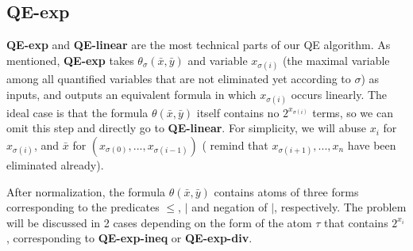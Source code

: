 \subsection{QE-exp}

\textbf{QE-exp} and \textbf{QE-linear} are the most technical parts of our QE algorithm.
As mentioned, 
\textbf{QE-exp} takes $\theta_{\sigma}(\bar{x},\bar{y})$ and  variable $x_{\sigma(i)}$ (the maximal variable among all quantified variables that are not eliminated yet according to $\sigma$) as 
inputs, and  outputs an equivalent formula in which $x_{\sigma(i)}$ occurs linearly.
The ideal case is that the formula $\theta(\bar{x},\bar{y})$ itself contains no $2^{x_{\sigma(i)}}$ terms, so we can omit this step and directly go to \textbf{QE-linear}.
For simplicity, we will abuse   $x_i$ for $x_{\sigma(i)}$, 
and  $\bar{x}$ for $(x_{\sigma(0)},...,x_{\sigma(i-1)})$ ( remind that $x_{\sigma(i+1)},...,x_n$ have been eliminated already).

After normalization, the formula $\theta(\bar{x},\bar{y})$ contains atoms of three forms corresponding to 
the predicates $\le$, $|$ and negation of $|$, respectively.
The problem will be discussed in 2 cases depending on the form of the atom $\tau$ that contains $2^{x_i}$, 
corresponding to \textbf{QE-exp-ineq} or \textbf{QE-exp-div}. 

